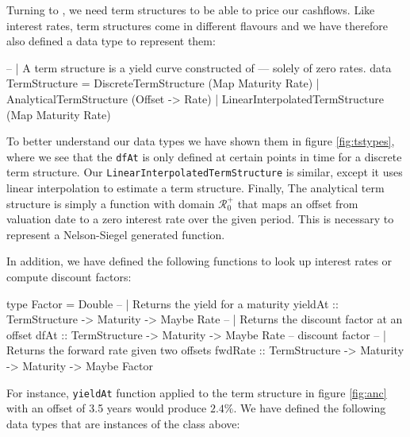 Turning to \hql, we need term structures to be able to price our cashflows.
Like interest rates, term structures come in different flavours and we 
have therefore also defined a data type to represent them:

\begin{hscode}
-- | A term structure is a yield curve constructed of
--- solely of zero rates.
data TermStructure = DiscreteTermStructure (Map Maturity Rate)
                   | AnalyticalTermStructure (Offset -> Rate)
                   | LinearInterpolatedTermStructure (Map Maturity Rate)
\end{hscode}


To better understand our data types we have shown them in figure \ref{fig:tstypes},
where we see that the \texttt{dfAt} is only defined at certain points in time for
a discrete term structure. Our \texttt{LinearInterpolatedTermStructure} is similar,
except it uses linear interpolation to estimate a term structure.
Finally, The analytical term structure is simply a function with domain $\mathcal{R}^+_0$
that maps an offset from valuation date to a zero interest rate over the given
period. This is necessary to represent a Nelson-Siegel generated function\cite{cmunk}.

In addition, we have defined the following functions to look up interest rates
or compute discount factors:

\begin{hscode}
type Factor = Double
-- | Returns the yield for a maturity
yieldAt :: TermStructure -> Maturity -> Maybe Rate
-- | Returns the discount factor at an offset
dfAt :: TermStructure -> Maturity -> Maybe Rate -- discount factor
-- | Returns the forward rate given two offsets
fwdRate :: TermStructure -> Maturity -> Maturity -> Maybe Factor
\end{hscode}

For instance, \texttt{yieldAt} function applied to the term structure in
figure \ref{fig:anc} with an offset of 3.5 years would produce $2.4\%$. We have
defined the following data types that are instances of the class above:

